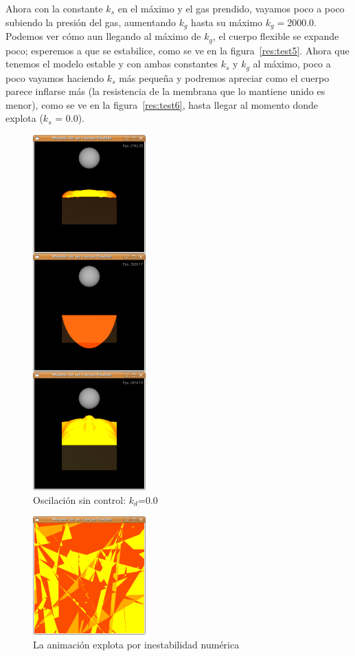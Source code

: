 Ahora con la constante $k_s$ en el máximo y el gas prendido, vayamos poco a poco subiendo la presión del gas, aumentando $k_g$ hasta su máximo $k_g=$2000.0. Podemos ver cómo aun llegando al máximo de $k_g$, el cuerpo flexible se expande poco; esperemos a que se estabilice, como se ve en la figura~\ref{res:test5}. Ahora que tenemos el modelo estable y con ambas constantes $k_s$ y $k_g$ al máximo, poco a poco vayamos haciendo $k_s$ más pequeña y podremos apreciar como el cuerpo parece inflarse más (la resistencia de la membrana que lo mantiene unido es menor), como se ve en la figura~\ref{res:test6}, hasta llegar al momento donde explota ($k_s$ = 0.0).

\begin{figure}
 \centering
 \includegraphics[]{Img/modRes1}
 \caption[Ejecución sin fuerza de amortiguamiento]{Oscilación sin control: $k_d$=0.0}
 \label{res:test1}
\end{figure}

\begin{figure}
 \centering
 \includegraphics[]{Img/modRes4}
 \caption[Explosión por inestabilidad numérica]{La animación explota por inestabilidad numérica}
 \label{res:test4}
\end{figure}

